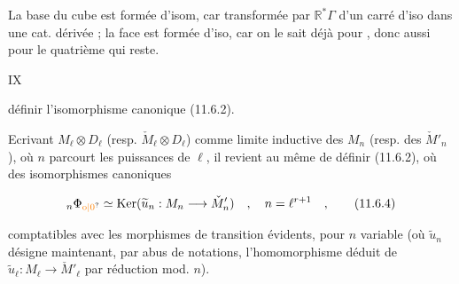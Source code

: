 

La base du cube est formée d'isom, car transformée par $\mathbb R^*\Gamma$ d'un carré d'iso dans une cat. dérivée ; la face  est formée d'iso, car on le sait déjà pour , donc aussi pour le quatrième qui reste.


\hfill IX

définir l'isomorphisme canonique (11.6.2).

Ecrivant $M_\ell\otimes D_\ell$ (resp. $\check{M}_\ell\otimes D_\ell$) comme limite inductive des $M_n$ (resp. des $\check{M}'_n$), où $n$ parcourt les puissances de $\ell$, il revient au même de définir (11.6.2), où des isomorphismes canoniques

\[
{}_n\Phi_{\unsure{\mathrm{o}|0}}\simeq\operatorname{Ker}(\widetilde{u}_n:M_n\longrightarrow\check{M}'_n)\quad,\quad n=\ell^{r+1}\quad,\tag*{(11.6.4)}
\]

comptatibles avec les morphismes de transition évidents, pour $n$ variable\handwritten{\unsure{!}} (où $\widetilde{u}_n$ désigne maintenant, par abus de notations, l'homomorphisme déduit de $\widetilde{u}_\ell:M_\ell\longrightarrow\check{M}'_\ell$ par réduction mod. $n$).

